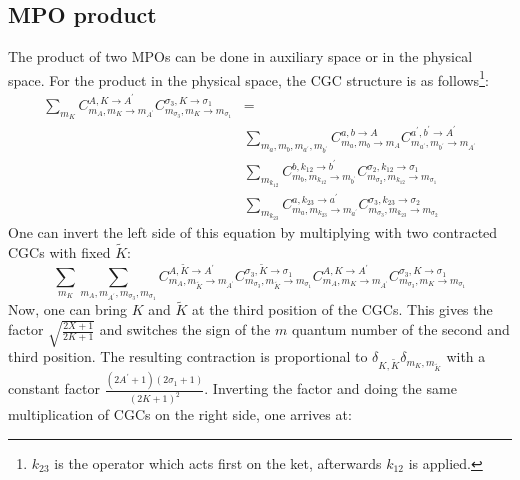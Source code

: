 \documentclass[a4paper,10pt,parskip=full]{scrartcl}
\begin{document}
\subsection{MPO product}
The product of two MPOs can be done in auxiliary space or in the
physical space. For the product in the physical space, the CGC
structure is as follows\footnote{$k_{23}$ is the operator which acts
  first on the ket, afterwards $k_{12}$ is applied.}:
\begin{equation}
  \begin{split}
  \sum_{m_K}C^{A,K\rightarrow A^\prime}_{m_A,m_{K}\rightarrow
    m_{A^\prime}}C^{\sigma_3,K\rightarrow
    \sigma_1}_{m_{\sigma_3},m_{K}\rightarrow m_{\sigma_1}}&=\\
  &\sum_{m_{a},m_{b},m_{a^\prime},m_{b^\prime}} C^{a,b\rightarrow A}_{{m_a,m_{b}}\rightarrow m_{A}}C^{a^\prime,b^\prime\rightarrow A^\prime}_{m_{a^\prime},m_{b^\prime}\rightarrow m_{A^\prime}}\\
  &\sum_{m_{k_{12}}}C^{b,k_{12}\rightarrow
    b^\prime}_{m_b,m_{k_{12}}\rightarrow
    m_{b^\prime}}C^{\sigma_2,k_{12}\rightarrow
    \sigma_1}_{m_{\sigma_2},m_{k_{12}}\rightarrow m_{\sigma_1}}\\
  &\sum_{m_{k_{23}}}C^{a,k_{23}\rightarrow a^\prime}_{m_a,m_{k_{23}}\rightarrow m_{a^\prime}}C^{\sigma_3,k_{23}\rightarrow \sigma_2}_{m_{\sigma_3},m_{k_{23}}\rightarrow m_{\sigma_2}}
  \end{split}
\end{equation}
One can invert the left side of this equation by multiplying with two
contracted CGCs with fixed $\tilde{K}$:
\begin{equation}
  \sum_{m_K}\sum_{m_{A},m_{A^\prime},m_{\sigma_3},m_{\sigma_1}}C^{A,\tilde{K}\rightarrow
    A^\prime}_{m_A,m_{\tilde{K}}\rightarrow m_{A^\prime}}C^{\sigma_3,\tilde{K}\rightarrow\sigma_1}_{m_{\sigma_3},m_{\tilde{K}}\rightarrow
    m_{\sigma_1}}
  C^{A,K\rightarrow
    A^\prime}_{m_A,m_{K}\rightarrow m_{A^\prime}}C^{\sigma_3,K\rightarrow\sigma_1}_{m_{\sigma_3},m_{K}\rightarrow
    m_{\sigma_1}}  
\end{equation}
Now, one can bring $K$ and $\tilde{K}$ at the third position of the
CGCs. This gives the factor $\sqrt{\frac{2X+1}{2K+1}}$ and switches
the sign of the $m$ quantum number of the second and third position.
The resulting contraction is proportional to
$\delta_{K,\tilde{K}}\delta_{m_K,m_{\tilde{K}}}$ with a constant
factor $\frac{(2A^\prime+1)(2\sigma_1+1)}{(2K+1)^2}$.
Inverting the factor and doing the same multiplication of CGCs on the
right side, one arrives at:
\end{document}
